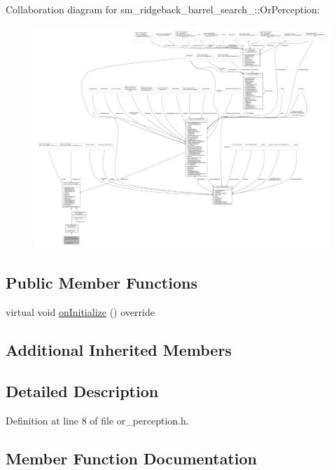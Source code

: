 Collaboration diagram for sm\+\_\+ridgeback\+\_\+barrel\+\_\+search\+\_\+:\+:Or\+Perception\+:
\nopagebreak
\begin{figure}[H]
\begin{center}
\leavevmode
\includegraphics[width=350pt]{classsm__ridgeback__barrel__search__2_1_1OrPerception__coll__graph}
\end{center}
\end{figure}
\subsection*{Public Member Functions}
\begin{DoxyCompactItemize}
\item 
virtual void \hyperlink{classsm__ridgeback__barrel__search__2_1_1OrPerception_ad3c3ea0b16beefae902e66096114bace}{on\+Initialize} () override
\end{DoxyCompactItemize}
\subsection*{Additional Inherited Members}


\subsection{Detailed Description}


Definition at line 8 of file or\+\_\+perception.\+h.



\subsection{Member Function Documentation}
\mbox{\label{classsm__ridgeback__barrel__search__2_1_1OrPerception_ad3c3ea0b16beefae902e66096114bace}} 
